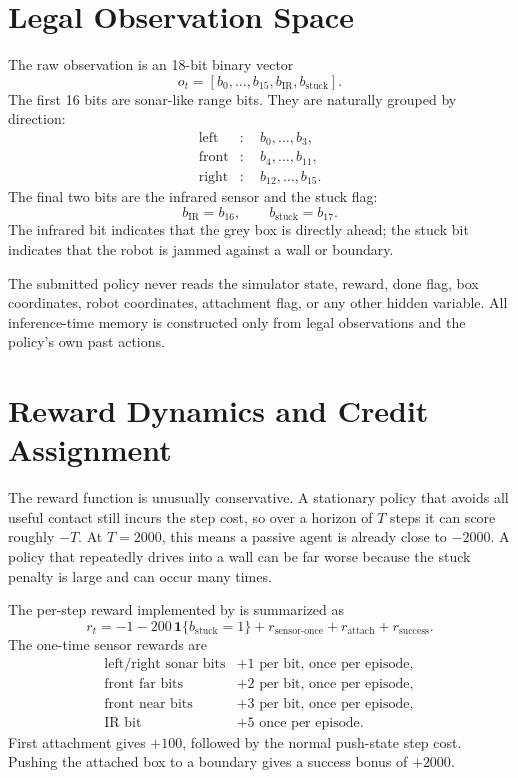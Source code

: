 \documentclass[11pt]{article}
\begin{document}
\section{Legal Observation Space}

The raw observation is an 18-bit binary vector
\[
  o_t=[b_0,\ldots,b_{15},b_{\text{IR}},b_{\text{stuck}}].
\]
The first 16 bits are sonar-like range bits. They are naturally grouped by direction:
\[
\begin{aligned}
  \text{left}  &: \quad b_0,\ldots,b_3,\\
  \text{front} &: \quad b_4,\ldots,b_{11},\\
  \text{right} &: \quad b_{12},\ldots,b_{15}.
\end{aligned}
\]
The final two bits are the infrared sensor and the stuck flag:
\[
  b_{\text{IR}}=b_{16},
  \qquad
  b_{\text{stuck}}=b_{17}.
\]
The infrared bit indicates that the grey box is directly ahead; the stuck bit indicates
that the robot is jammed against a wall or boundary.

The submitted policy never reads the simulator state, reward, done flag, box
coordinates, robot coordinates, attachment flag, or any other hidden variable. All
inference-time memory is constructed only from legal observations and the policy's own
past actions.

\section{Reward Dynamics and Credit Assignment}

The reward function is unusually conservative. A stationary policy that avoids all useful
contact still incurs the step cost, so over a horizon of \(T\) steps it can score roughly
\(-T\). At \(T=2000\), this means a passive agent is already close to \(-2000\). A
policy that repeatedly drives into a wall can be far worse because the stuck penalty is
large and can occur many times.

The per-step reward implemented by  is summarized as
\[
  r_t =
  -1
  - 200\,\mathbf{1}\{b_{\text{stuck}}=1\}
  + r_{\text{sensor-once}}
  + r_{\text{attach}}
  + r_{\text{success}}.
\]
The one-time sensor rewards are
\[
\begin{array}{ll}
\text{left/right sonar bits} & +1 \text{ per bit, once per episode},\\
\text{front far bits}       & +2 \text{ per bit, once per episode},\\
\text{front near bits}      & +3 \text{ per bit, once per episode},\\
\text{IR bit}               & +5 \text{ once per episode}.
\end{array}
\]
First attachment gives \(+100\), followed by the normal push-state step cost. Pushing
the attached box to a boundary gives a success bonus of \(+2000\).
\end{document}
